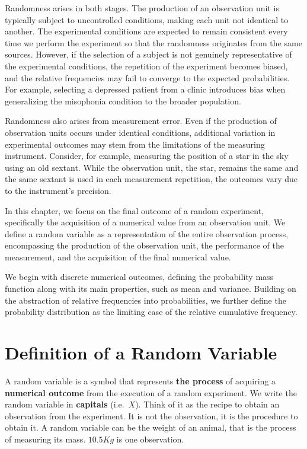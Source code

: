 \documentclass[
]{book}
\begin{document}
Randomness arises in both stages. The production of an observation unit is typically subject to uncontrolled conditions, making each unit not identical to another. The experimental conditions are expected to remain consistent every time we perform the experiment so that the randomness originates from the same sources. However, if the selection of a subject is not genuinely representative of the experimental conditions, the repetition of the experiment becomes biased, and the relative frequencies may fail to converge to the expected probabilities. For example, selecting a depressed patient from a clinic introduces bias when generalizing the misophonia condition to the broader population.

Randomness also arises from measurement error. Even if the production of observation units occurs under identical conditions, additional variation in experimental outcomes may stem from the limitations of the measuring instrument. Consider, for example, measuring the position of a star in the sky using an old sextant. While the observation unit, the star, remains the same and the same sextant is used in each measurement repetition, the outcomes vary due to the instrument's precision.

In this chapter, we focus on the final outcome of a random experiment, specifically the acquisition of a numerical value from an observation unit. We define a random variable as a representation of the entire observation process, encompassing the production of the observation unit, the performance of the measurement, and the acquisition of the final numerical value.

We begin with discrete numerical outcomes, defining the probability mass function along with its main properties, such as mean and variance. Building on the abstraction of relative frequencies into probabilities, we further define the probability distribution as the limiting case of the relative cumulative frequency.

\hypertarget{definition-of-a-random-variable}{%
\section{Definition of a Random Variable}\label{definition-of-a-random-variable}}

A random variable is a symbol that represents \textbf{the process} of acquiring a \textbf{numerical outcome} from the execution of a random experiment. We write the random variable in \textbf{capitals} (i.e.~\(X\)). Think of it as the recipe to obtain an observation from the experiment. It is not the observation, it is the procedure to obtain it. A random variable can be the weight of an animal, that is the process of measuring its mass. \(10.5Kg\) is one observation.
\end{document}
